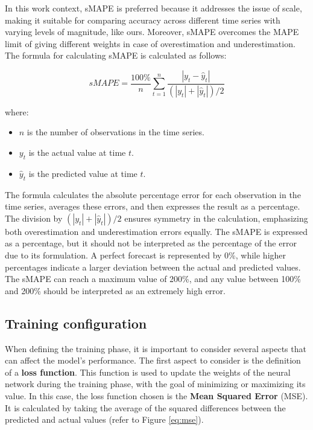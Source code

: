 In this work context, sMAPE is preferred because it addresses the issue of scale, making it suitable for comparing accuracy across different time series with varying levels of magnitude, like ours. Moreover, sMAPE overcomes the MAPE limit of giving different weights in case of overestimation and underestimation. The formula for calculating sMAPE is calculated as follows:

\begin{equation}
sMAPE = \frac{100\%}{n} \sum_{t=1}^{n} \frac{|y_t - \hat{y}_t|}{( |y_t| + |\hat{y}_t| ) / 2}
\end{equation}

where:
\begin{itemize}[noitemsep,  leftmargin=*]
  \item[] \( n \) is the number of observations in the time series.
  \item[] \( y_t \) is the actual value at time \( t \).
  \item[] \( \hat{y}_t \) is the predicted value at time \( t \).
\end{itemize}

The formula calculates the absolute percentage error for each observation in the time series, averages these errors, and then expresses the result as a percentage. The division by \( (|y_t| + |\hat{y}_t|) / 2 \) ensures symmetry in the calculation, emphasizing both overestimation and underestimation errors equally. The sMAPE is expressed as a percentage, but it should not be interpreted as the percentage of the error due to its formulation. A perfect forecast is represented by 0\%, while higher percentages indicate a larger deviation between the actual and predicted values. The sMAPE can reach a maximum value of 200\%, and any value between 100\% and 200\% should be interpreted as an extremely high error.

\subsection{Training configuration}

When defining the training phase, it is important to consider several aspects that can affect the model's performance.
The first aspect to consider is the definition of a \textbf{loss function}. This function is used to update the weights of the neural network during the training phase, with the goal of minimizing or maximizing its value. In this case, the loss function chosen is the \textbf{Mean Squared Error} (MSE). It is calculated by taking the average of the squared differences between the predicted and actual values (refer to Figure \ref{eq:mse}).

